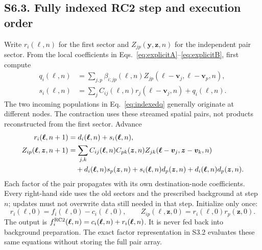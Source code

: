 \documentclass[10pt,letterpaper]{article}
\begin{document}
\newpage
\subsection*{S6.3. Fully indexed RC2 step and execution order}
Write $r_i(\bm\ell,n)$ for the first sector and $Z_{jp}(\bm y,\bm z,n)$ for the independent pair sector. From the local coefficients in Eqs.~\eqref{eq:explicitA}--\eqref{eq:explicitB}, first compute
\begin{align}
 q_i(\bm\ell,n)&=\sum_{j,p}\beta_{i;jp}(\bm\ell,n)
 Z_{jp}(\bm\ell-\bm v_j,\bm\ell-\bm v_p,n),\label{eq:indexedq}\\
 s_i(\bm\ell,n)&=\sum_jC_{ij}(\bm\ell,n)r_j(\bm\ell-\bm v_j,n)+q_i(\bm\ell,n).
\end{align}
The two incoming populations in Eq.~\eqref{eq:indexedq} generally originate at different nodes. The contraction uses these streamed spatial pairs, not products reconstructed from the first sector. Advance
\begin{align}
 r_i(\bm\ell,n+1)&=d_i(\bm\ell,n)+s_i(\bm\ell,n),\label{eq:indexedr}\\
 Z_{ip}(\bm\ell,\bm z,n+1)
 &=\sum_{j,k}C_{ij}(\bm\ell,n)C_{pk}(\bm z,n)
 Z_{jk}(\bm\ell-\bm v_j,\bm z-\bm v_k,n)\notag\\
 &\quad+d_i(\bm\ell,n)s_p(\bm z,n)+s_i(\bm\ell,n)d_p(\bm z,n)
 +d_i(\bm\ell,n)d_p(\bm z,n).
 \label{eq:indexedZ}
\end{align}
Each factor of the pair propagates with its own destination-node coefficients. Every right-hand side uses the old sectors and the prescribed background at step $n$; updates must not overwrite data still needed in that step. Initialize only once:
\begin{equation}
 r_i(\bm\ell,0)=f_i(\bm\ell,0)-c_i(\bm\ell,0),\qquad
 Z_{ip}(\bm\ell,\bm z,0)=r_i(\bm\ell,0)r_p(\bm z,0).
\end{equation}
The output is $f_i^{\rm RC2}(\bm\ell,n)=c_i(\bm\ell,n)+r_i(\bm\ell,n)$. It is never fed back into background preparation. The exact factor representation in S3.2 evaluates these same equations without storing the full pair array.
\end{document}
